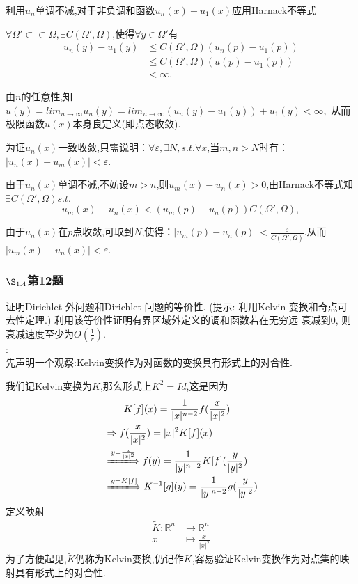 \documentclass[12pt, a4paper]{ctexart}
\begin{document}
		利用$u_n$单调不减,对于非负调和函数$u_n(x)-u_1(x)$应用Harnack不等式
		
		$\forall\Omega'\subset \subset \Omega,\exists C(\Omega',\Omega)$,使得$\forall y\in \overline{\Omega}'$有
		\begin{align*}
		u_n(y)-u_1(y)&\leq C(\Omega',\Omega)(u_n(p)-u_1(p))\\&\leq C(\Omega',\Omega)(u(p)-u_1(p))\\&< \infty.
		\end{align*}
		
		由$n$的任意性,知$u(y)=lim_{n \to \infty}u_n(y)=lim_{n \to \infty}(u_n(y)-u_1(y))+u_1(y)<\infty,$
		从而极限函数$u(x)$本身良定义(即点态收敛).
		
		为证$u_n(x)$一致收敛,只需说明：$\forall \varepsilon,\exists N,s.t.\forall x$,当$m,n>N$时有：$|u_n(x)-u_m(x)|<\varepsilon.$
		
		由于$u_n(x)$单调不减,不妨设$m>n$,则$u_m(x)-u_n(x)>0$,由Harnack不等式知$\exists C(\Omega',\Omega) s.t.$
		$$u_m(x)-u_n(x)<(u_m(p)-u_n(p))C(\Omega',\Omega),$$
		
		由于$u_n(x)$在$p$点收敛,可取到$N$,使得：$|u_m(p)-u_n(p)|<\frac{\varepsilon}{C(\Omega',\Omega)}.$从而$|u_m(x)-u_n(x)|<\varepsilon.$

	
	
	\subsubsection{$\S_{1.4}$第12题}
	\kaishu{}证明Dirichlet 外问题和Dirichlet 问题的等价性. (提示: 利用Kelvin 变换和奇点可去性定理.) 利用该等价性证明有界区域外定义的调和函数若在无穷远
	衰减到0, 则衰减速度至少为$O(\frac{1}{r})$.\\

	\songti{}:\\
	
	先声明一个观察:Kelvin变换作为对函数的变换具有形式上的对合性.
	
	我们记Kelvin变换为$K$,那么形式上$K^2=Id$,这是因为
	\begin{align*}
		&\qquad K[f](x)=\frac{1}{|x|^{n-2}}f(\frac{x}{|x|^2})\\
		&\Rightarrow f(\frac{x}{|x|^2})=|x|^2 K[f](x)\\
		&\xLongrightarrow{y=\frac{x}{|x|^2}} f(y)=\frac{1}{|y|^{n-2}} K[f](\frac{y}{|y|^2})\\
		&\xLongrightarrow{g=K[f]} K^{-1}[g](y)=\frac{1}{|y|^{n-2}} g(\frac{y}{|y|^2})
	\end{align*}
	定义映射
	\begin{align*}
	\tilde{K}: 	\mathbb{R}^n &\rightarrow \mathbb{R}^n\\
	x &\mapsto \frac{x}{|x|^2}
	\end{align*}
	为了方便起见,$\tilde{K}$仍称为Kelvin变换,仍记作$K$,容易验证Kelvin变换作为对点集的映射具有形式上的对合性.
	
\end{document}
